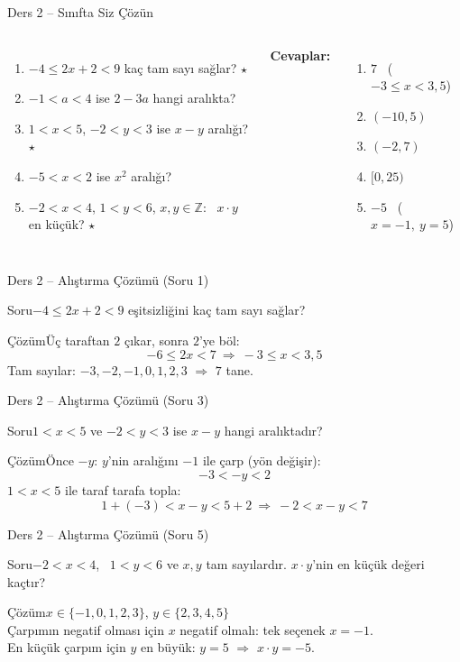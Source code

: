 \documentclass[aspectratio=169,11pt,handout]{beamer}
\newcommand{\soru}[3]{%
\begin{frame}{#1}
  \begin{block}{Soru}\large #2\end{block}
  \pause
  \begin{exampleblock}{Çözüm}\large #3\end{exampleblock}
\end{frame}}
\begin{document}
\begin{frame}{Ders 2 -- Sınıfta Siz Çözün}
\begin{columns}[t]
\begin{enumerate}
\item \(-4\le 2x+2<9\) kaç tam sayı sağlar? \(\star\)
\item \(-1<a<4\) ise \(2-3a\) hangi aralıkta?
\item \(1<x<5\), \(-2<y<3\) ise \(x-y\) aralığı? \(\star\)
\item \(-5<x<2\) ise \(x^2\) aralığı?
\item \(-2<x<4\), \(1<y<6\), \(x,y\in\mathbb{Z}\): \ \(x\cdot y\) en küçük? \(\star\)
\end{enumerate}
\pause
\textbf{Cevaplar:}
\begin{enumerate}
\item \(7\) \ (\(-3\le x<3{,}5\))
\item \((-10,5)\)
\item \((-2,7)\)
\item \([0,25)\)
\item \(-5\) \ (\(x=-1,\ y=5\))
\end{enumerate}
\end{columns}
\vspace{4pt}{\footnotesize \(\star\) işaretli soruların adım adım çözümü sonraki slaytlardadır.}
\end{frame}

\soru{Ders 2 -- Alıştırma Çözümü (Soru 1)}
{\(-4\le 2x+2<9\) eşitsizliğini kaç tam sayı sağlar?}
{Üç taraftan \(2\) çıkar, sonra \(2\)'ye böl:
\[-6\le 2x<7\ \Rightarrow\ -3\le x<3{,}5\]
Tam sayılar: \(-3,-2,-1,0,1,2,3\) \(\Rightarrow\) \(7\) tane.}

\soru{Ders 2 -- Alıştırma Çözümü (Soru 3)}
{\(1<x<5\) ve \(-2<y<3\) ise \(x-y\) hangi aralıktadır?}
{Önce \(-y\): \(y\)'nin aralığını \(-1\) ile çarp (yön değişir):
\[-3<-y<2\]
\(1<x<5\) ile taraf tarafa topla:
\[1+(-3)<x-y<5+2\ \Rightarrow\ -2<x-y<7\]}

\soru{Ders 2 -- Alıştırma Çözümü (Soru 5)}
{\(-2<x<4\), \ \(1<y<6\) ve \(x,y\) tam sayılardır. \(x\cdot y\)'nin en küçük değeri kaçtır?}
{\(x\in\{-1,0,1,2,3\}\), \quad \(y\in\{2,3,4,5\}\)\\[3pt]
Çarpımın negatif olması için \(x\) negatif olmalı: tek seçenek \(x=-1\).\\[3pt]
En küçük çarpım için \(y\) en büyük: \(y=5\) \(\Rightarrow\) \(x\cdot y=-5\).}
\end{document}
